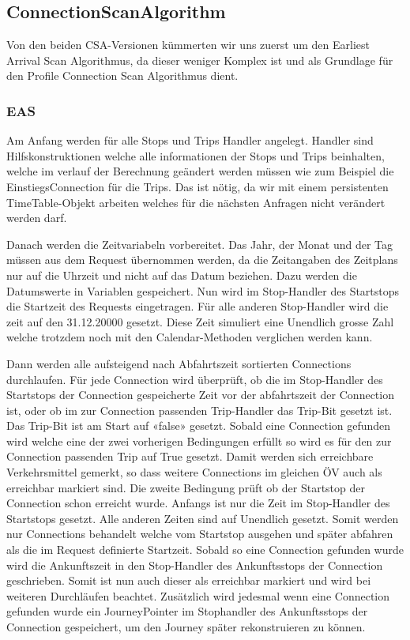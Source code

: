 \subsection{ConnectionScanAlgorithm}
Von den beiden CSA-Versionen kümmerten wir uns zuerst um den Earliest Arrival Scan Algorithmus, da dieser weniger Komplex ist und als Grundlage für den Profile Connection Scan Algorithmus dient.
\subsubsection{EAS}
Am Anfang werden für alle Stops und Trips Handler angelegt. Handler sind Hilfskonstruktionen welche alle informationen der Stops und Trips beinhalten, welche im verlauf der Berechnung geändert werden müssen wie zum Beispiel die EinstiegsConnection für die Trips. Das ist nötig, da wir mit einem persistenten TimeTable-Objekt arbeiten welches für die nächsten Anfragen nicht verändert werden darf.
\newline


Danach werden die Zeitvariabeln vorbereitet. Das Jahr, der Monat und der Tag müssen aus dem Request übernommen werden, da die Zeitangaben des Zeitplans nur auf die Uhrzeit und nicht auf das Datum beziehen. Dazu werden die Datumswerte in Variablen gespeichert.  Nun wird im Stop-Handler des Startstops die Startzeit des Requests eingetragen. Für alle anderen Stop-Handler wird die zeit auf den 31.12.20000 gesetzt. Diese Zeit simuliert eine Unendlich grosse Zahl welche trotzdem noch mit den Calendar-Methoden verglichen werden kann.
\newline


Dann werden alle aufsteigend nach Abfahrtszeit sortierten Connections durchlaufen. Für jede Connection wird überprüft, ob die im Stop-Handler des Startstops der Connection gespeicherte Zeit vor der abfahrtszeit der Connection ist, oder ob im zur Connection passenden Trip-Handler das Trip-Bit gesetzt ist. Das Trip-Bit ist am Start auf «false» gesetzt. Sobald eine Connection gefunden wird welche eine der zwei vorherigen Bedingungen erfüllt so wird es für den zur Connection passenden Trip auf True gesetzt. Damit werden sich erreichbare Verkehrsmittel gemerkt, so dass weitere Connections im gleichen ÖV auch als erreichbar markiert sind. Die zweite Bedingung prüft ob der Startstop der Connection schon erreicht wurde. Anfangs ist nur die Zeit im Stop-Handler des Startstops gesetzt. Alle anderen Zeiten sind auf Unendlich gesetzt. Somit werden nur Connections behandelt welche vom Startstop ausgehen und später abfahren als die im Request definierte Startzeit. Sobald so eine Connection gefunden wurde wird die Ankunftszeit in den Stop-Handler des Ankunftsstops der Connection geschrieben. Somit ist nun auch dieser als erreichbar markiert und wird bei weiteren Durchläufen beachtet. Zusätzlich wird jedesmal wenn eine Connection gefunden wurde ein JourneyPointer im Stophandler des Ankunftsstops der Connection gespeichert, um den Journey später rekonstruieren zu können.
\newline


